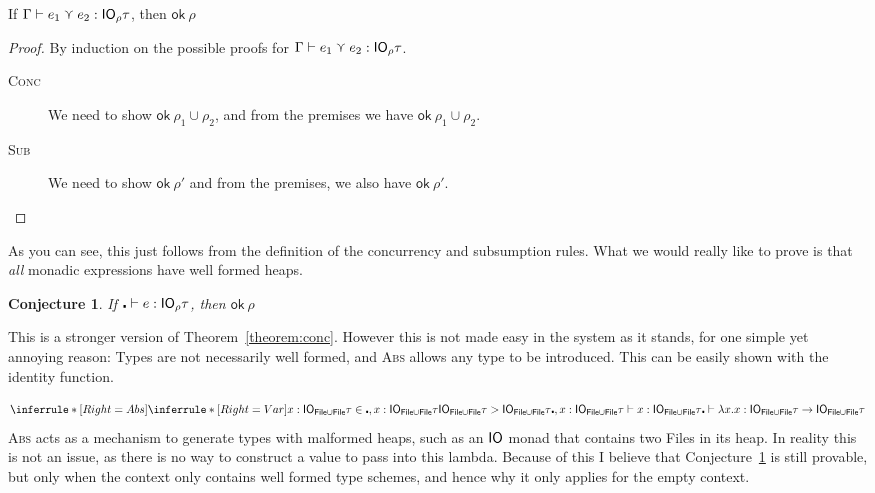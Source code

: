 \begin{theorem}\label{theorem:conc}
  If $\Gamma \vdash e_1 \curlyvee e_2 : \mathsf{IO}_\rho \tau$, then $\textsf{ok} \ \rho$
\end{theorem}
\begin{proof}
  By induction on the possible proofs for $\Gamma \vdash e_1 \curlyvee e_2 : \mathsf{IO}_\rho \tau$.
  \begin{description}
  \item[\rm\textsc{Conc}]
    We need to show $\textsf{ok} \ \rho_1 \cup \rho_2$, and from the premises we have $\textsf{ok} \ \rho_1 \cup \rho_2$.
  \item[\rm\textsc{Sub}]
    We need to show $\textsf{ok} \ \rho'$ and from the premises, we also have $\textsf{ok} \ \rho'$. 
  \end{description}
\end{proof}
As you can see, this just follows from the definition of the
concurrency and subsumption rules.
What we would really like to prove is that \emph{all} monadic
expressions have well formed heaps.
\newtheorem{conjecture}{Conjecture}
\begin{conjecture}\label{conjecture:strongconc}
  If $\centerdot \vdash e : \mathsf{IO}_\rho \tau$, then $\textsf{ok} \ \rho$
\end{conjecture}
This is a stronger version of Theorem~\ref{theorem:conc}. However this
is not made easy in the system as it stands, for one simple yet
annoying reason: Types are not necessarily well formed, and
\textsc{Abs} allows any type to be introduced. This can be easily
shown with the identity function.

\[
  \inferrule*[Right=Abs]{
  \inferrule*[Right=Var]{x : \IO_{\textsf{File} \cup \textsf{File}} \tau  \in
    \centerdot , x : \IO_{\textsf{File} \cup \textsf{File}} \tau \\  \IO_{\textsf{File} \cup \textsf{File}} \tau >
    \IO_{\textsf{File} \cup \textsf{File}} \tau }{\centerdot , x : \IO_{\textsf{File} \cup
      \textsf{File}} \tau \vdash x : \IO_{\textsf{File} \cup \textsf{File}} \tau}
}
{\centerdot \vdash \lambda x . x : \IO_{\textsf{File} \cup \textsf{File}} \tau \rightarrow \IO_{\textsf{File} \cup \textsf{File}} \tau}
\]
\textsc{Abs} acts as a mechanism to generate types with malformed heaps, such as
an $\mathsf{IO}$ monad that contains two \textsf{File}s in its heap.  In
reality this is not an issue, as there is no way to construct a value
to pass into this lambda. Because of this I believe that Conjecture~\ref{conjecture:strongconc} is still
provable, but only when the context only contains well formed type
schemes, and hence why it only applies for the empty context.

